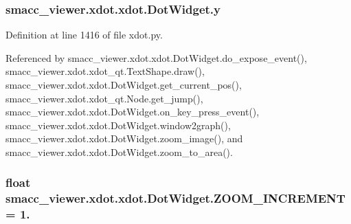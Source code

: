 \subsubsection[{\texorpdfstring{y}{y}}]{\setlength{\rightskip}{0pt plus 5cm}smacc\+\_\+viewer.\+xdot.\+xdot.\+Dot\+Widget.\+y}\hypertarget{classsmacc__viewer_1_1xdot_1_1xdot_1_1DotWidget_a1f5ee9fba6b3fe02772831d9bf6d7481}{}\label{classsmacc__viewer_1_1xdot_1_1xdot_1_1DotWidget_a1f5ee9fba6b3fe02772831d9bf6d7481}


Definition at line 1416 of file xdot.\+py.



Referenced by smacc\+\_\+viewer.\+xdot.\+xdot.\+Dot\+Widget.\+do\+\_\+expose\+\_\+event(), smacc\+\_\+viewer.\+xdot.\+xdot\+\_\+qt.\+Text\+Shape.\+draw(), smacc\+\_\+viewer.\+xdot.\+xdot.\+Dot\+Widget.\+get\+\_\+current\+\_\+pos(), smacc\+\_\+viewer.\+xdot.\+xdot\+\_\+qt.\+Node.\+get\+\_\+jump(), smacc\+\_\+viewer.\+xdot.\+xdot.\+Dot\+Widget.\+on\+\_\+key\+\_\+press\+\_\+event(), smacc\+\_\+viewer.\+xdot.\+xdot.\+Dot\+Widget.\+window2graph(), smacc\+\_\+viewer.\+xdot.\+xdot.\+Dot\+Widget.\+zoom\+\_\+image(), and smacc\+\_\+viewer.\+xdot.\+xdot.\+Dot\+Widget.\+zoom\+\_\+to\+\_\+area().

\subsubsection[{\texorpdfstring{Z\+O\+O\+M\+\_\+\+I\+N\+C\+R\+E\+M\+E\+NT}{ZOOM_INCREMENT}}]{\setlength{\rightskip}{0pt plus 5cm}float smacc\+\_\+viewer.\+xdot.\+xdot.\+Dot\+Widget.\+Z\+O\+O\+M\+\_\+\+I\+N\+C\+R\+E\+M\+E\+NT = 1.\hspace{0.3cm}{\ttfamily [static]}}\hypertarget{classsmacc__viewer_1_1xdot_1_1xdot_1_1DotWidget_a1c0d2875d33064ba8d476e8142b05a0f}{}\label{classsmacc__viewer_1_1xdot_1_1xdot_1_1DotWidget_a1c0d2875d33064ba8d476e8142b05a0f}


